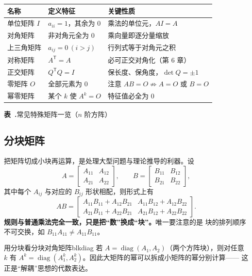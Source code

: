 \documentclass[11pt,a4paper,openany]{ctexbook}
\DeclareMathOperator{\diag}{diag}
\newcounter{tabnum}[chapter]
\newenvironment{latab}[1]{%
  \par\addvspace{9pt}%
  \stepcounter{tabnum}%
  \gdef\latabcap{#1}%
  \begin{center}%
  \begin{minipage}{0.94\textwidth}%
}{%
  \end{minipage}%
  \par\vspace{4pt}%
  {\small\sffamily\color{qing}\textbf{表~\thechapter.\arabic{tabnum}}\quad \latabcap\par}%
  \vspace{3pt}%
  \end{center}%
  \addvspace{8pt}%
}
\begin{document}
\begin{latab}{常见特殊矩阵一览（$n$ 阶方阵）}
\small\centering
\renewcommand{\arraystretch}{1.34}
\begin{tabular}{@{}lll@{}}
\toprule
\sffamily 名称 & \sffamily 定义特征 & \sffamily 关键性质\\
\midrule
单位矩阵 $I$ & $a_{ii}=1$，其余为 $0$ & 乘法的单位元，$AI=A$\\
对角矩阵 & 非对角元全为 $0$ & 乘向量即逐分量缩放\\
上三角矩阵 & $a_{ij}=0\ (i>j)$ & 行列式等于对角元之积\\
对称矩阵 & $A^{\mathsf T}=A$ & 必可正交对角化（第 6 章）\\
正交矩阵 & $Q^{\mathsf T}Q=I$ & 保长度、保角度，$\det Q=\pm 1$\\
零矩阵 $O$ & 全部元素为 $0$ & 注意 $AB=O\not\Rightarrow A=O$ 或 $B=O$\\
幂零矩阵 & 某个 $k$ 使 $A^k=O$ & 特征值必全为 $0$\\
\bottomrule
\end{tabular}
\end{latab}

\subsection{分块矩阵}

把矩阵切成小块再运算，是处理大型问题与理论推导的利器。设
\[
A=\begin{bmatrix}A_{11} & A_{12}\\ A_{21} & A_{22}\end{bmatrix},
\qquad
B=\begin{bmatrix}B_{11} & B_{12}\\ B_{21} & B_{22}\end{bmatrix},
\]
其中每个 $A_{ij}$ 与对应的 $B_{ij}$ 形状相配，则形式上有
\[
AB=\begin{bmatrix}
A_{11}B_{11}+A_{12}B_{21} & A_{11}B_{12}+A_{12}B_{22}\\
A_{21}B_{11}+A_{22}B_{21} & A_{21}B_{12}+A_{22}B_{22}
\end{bmatrix}.
\]
\textbf{规则与普通乘法完全一致，只是把“数”换成“块”。}唯一要注意的是
块的排列顺序不可交换，如 $B_{11}A_{11}\neq A_{11}B_{11}$。

\begin{exmp}{用分块看分块对角矩阵}{blkdiag}
若 $A=\diag(A_1,A_2)$（两个方阵块），则对任意 $k$ 有
$A^k=\diag(A_1^k,A_2^k)$。因此大矩阵的幂可以拆成小矩阵的幂分别计算——
这正是“解耦”思想的代数表达。
\end{exmp}
\end{document}
